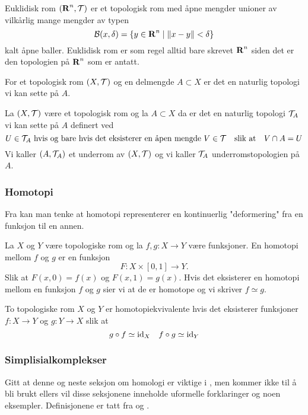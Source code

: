 \begin{eksempel}\label{Ex:EukTRom}
    Euklidisk rom $(\textnormal{\textbf{{R}}}^n,\mathcal{T})$ er et topologisk rom
    med åpne mengder unioner av vilkårlig mange mengder av
    typen
    \[\mathcal{B}(x,\delta) = \{y\in\textnormal{\textbf{{R}}}^n\;|\;
    \|x-y\|<\delta\}\]
    kalt åpne baller. Euklidisk rom er som regel alltid
    bare skrevet $\textnormal{\textbf{{R}}}^n$ siden det er den topologien på
    $\textnormal{\textbf{{R}}}^n$ som er antatt.
\end{eksempel}

For et topologisk rom $(X,\mathcal{T})$ og en delmengde
$A\subset X$ er det en naturlig topologi vi kan sette på
$A$.

\begin{definisjon}\label{Def:UnderTop}
    La $(X,\mathcal{T})$ være et topologisk rom og la $A\subset
    X$ da er det en naturlig topologi $\mathcal{T}_A$ vi kan
    sette på $A$ definert ved
    \[U\in\mathcal{T}_A \text{ hvis og bare hvis det eksisterer
    en åpen mengde } V\in\mathcal{T}\quad\text{slik at}\quad
    V\cap A = U\]
    Vi kaller $(A,\mathcal{T}_A)$ et underrom av $(X,\mathcal{T})$ og
    vi kaller $\mathcal{T}_A$ underromstopologien på $A$.
\end{definisjon}


\subsubsection{Homotopi}\label{sec:Homotopi}
Fra \citep[seksjon 51]{Munkres2013} kan man tenke at
homotopi representerer en kontinuerlig "deformering" fra en
funksjon til en annen.

\begin{definisjon}\label{Def:Homotopi}
    La $X$ og $Y$ være topologiske rom og la $f,g: X\to Y$
    være funksjoner. En homotopi mellom $f$ og $g$ er en
    funksjon
    \[F: X\times[0,1]\to Y.\]
    Slik at $F(x,0)=f(x)$ og $F(x,1)=g(x)$.
    Hvis det eksisterer en homotopi mellom en funksjon $f$
    og $g$ sier vi at de er homotope og vi skriver
    $f\simeq g$.
\end{definisjon} 

\begin{definisjon}\label{Def:HomotopiEkv}
    To topologiske rom $X$ og $Y$ er homotopiekvivalente
    hvis det eksisterer funksjoner $f: X\to Y$ og $g: Y\to
    X$ slik at
    \[g\circ f\simeq\textnormal{id}_X\quad f\circ g \simeq \textnormal{id}_Y\]
\end{definisjon}

\subsubsection{Simplisialkomplekser}\label{sek:SimpKomp}
Gitt at denne og neste seksjon om homologi er viktige
i , men kommer ikke til å bli
brukt ellers vil disse seksjonene inneholde uformelle
forklaringer og noen eksempler. Definisjonene er tatt fra
\citep[seksjon 1]{MunkresJamesR.2018EOAT} og
\citep[seksjon 2]{MunkresJamesR.2018EOAT}.

